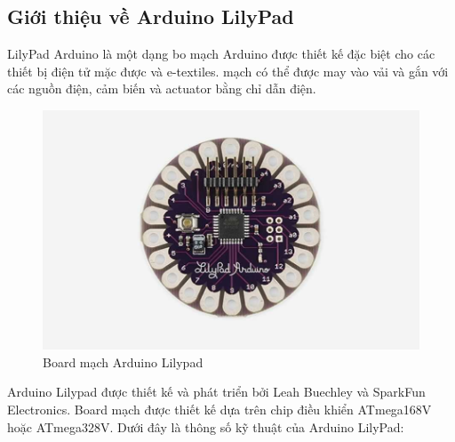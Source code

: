 \subsection{Giới thiệu về Arduino LilyPad}
\indent LilyPad Arduino là một dạng bo mạch Arduino được thiết kế đặc biệt cho các thiết bị điện tử mặc được và e-textiles.  mạch có thể được may vào vải và gắn với các nguồn điện, cảm biến và actuator bằng chỉ dẫn điện.
\begin{figure}[H]
    \centering
    \includegraphics[width=\textwidth,height=\textheight,keepaspectratio]{Images/Theoretical basis/lilypad_main.jpg}
    \caption{Board mạch Arduino Lilypad}
    \label{fig:enter-label}
\end{figure}
\indent Arduino Lilypad được thiết kế và phát triển bởi Leah Buechley và SparkFun Electronics. Board mạch được thiết kế dựa trên chip điều khiển ATmega168V hoặc ATmega328V. Dưới đây là thông số kỹ thuật của  Arduino LilyPad:

